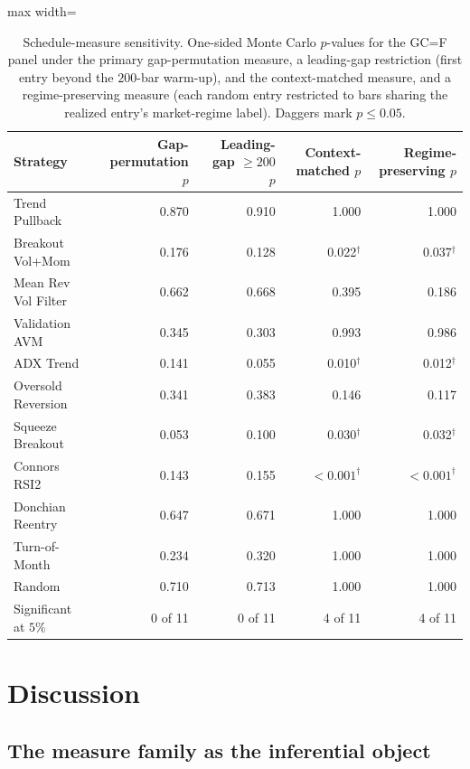 \documentclass[risks,article,submit,pdftex,oneauthor]{Definitions/mdpi}
\begin{document}
\begin{table}[H]
\centering
\caption{Schedule-measure sensitivity. One-sided Monte Carlo $p$-values for the GC=F panel under the primary gap-permutation measure, a leading-gap restriction (first entry beyond the $200$-bar warm-up), and the context-matched measure, and a regime-preserving measure (each random entry restricted to bars sharing the realized entry's market-regime label). Daggers mark $p\le 0.05$.}
\label{tab:schedule_sensitivity}
{\small
\renewcommand{\arraystretch}{1.12}
\setlength{\tabcolsep}{7pt}
\begin{adjustbox}{max width=\textwidth}
\begin{tabular}{@{}lrrrr@{}}
\toprule
Strategy & Gap-permutation $p$ & Leading-gap $\ge 200$ $p$ & Context-matched $p$ & Regime-preserving $p$ \\
\midrule
Trend Pullback      & 0.870 & 0.910 & 1.000 & 1.000 \\
Breakout Vol+Mom    & 0.176 & 0.128 & 0.022$^\dagger$ & 0.037$^\dagger$ \\
Mean Rev Vol Filter & 0.662 & 0.668 & 0.395 & 0.186 \\
Validation AVM      & 0.345 & 0.303 & 0.993 & 0.986 \\
ADX Trend           & 0.141 & 0.055 & 0.010$^\dagger$ & 0.012$^\dagger$ \\
Oversold Reversion  & 0.341 & 0.383 & 0.146 & 0.117 \\
Squeeze Breakout    & 0.053 & 0.100 & 0.030$^\dagger$ & 0.032$^\dagger$ \\
Connors RSI2        & 0.143 & 0.155 & ${<}0.001^\dagger$ & ${<}0.001^\dagger$ \\
Donchian Reentry    & 0.647 & 0.671 & 1.000 & 1.000 \\
Turn-of-Month       & 0.234 & 0.320 & 1.000 & 1.000 \\
Random              & 0.710 & 0.713 & 1.000 & 1.000 \\
\midrule
Significant at $5\%$ & 0 of 11 & 0 of 11 & 4 of 11 & 4 of 11 \\
\bottomrule
\end{tabular}
\end{adjustbox}
}
\end{table}


\section{Discussion}
\label{sec:discussion}


\subsection{The measure family as the inferential object}
\label{sec:discussion-measure}
\end{document}
